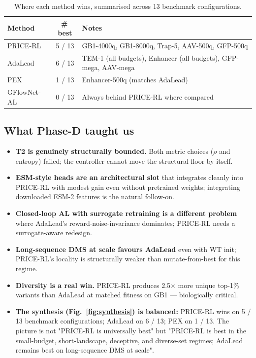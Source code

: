 \begin{table}[t]
\centering
\caption{Where each method wins, summarised across 13 benchmark configurations.}
\label{tab:wins}
\small
\begin{tabular}{lcp{}}
\toprule
Method & \#\,best & Notes \\
\midrule
PRICE-RL    & 5 / 13 & GB1-4000q, GB1-8000q, Trap-5, AAV-500q, GFP-500q \\
AdaLead     & 6 / 13 & TEM-1 (all budgets), Enhancer (all budgets), GFP-mega, AAV-mega \\
PEX         & 1 / 13 & Enhancer-500q (matches AdaLead) \\
GFlowNet-AL & 0 / 13 & Always behind PRICE-RL where compared \\
\bottomrule
\end{tabular}
\end{table}

\subsection{What Phase-D taught us}

\begin{itemize}\itemsep0pt
  \item \textbf{T2 is genuinely structurally bounded.} Both metric choices (\(\rho\) and entropy) failed; the controller cannot move the structural floor by itself.
  \item \textbf{ESM-style heads are an architectural slot} that integrates cleanly into PRICE-RL with modest gain even without pretrained weights; integrating downloaded ESM-2 features is the natural follow-on.
  \item \textbf{Closed-loop AL with surrogate retraining is a different problem} where AdaLead's reward-noise-invariance dominates; PRICE-RL needs a surrogate-aware redesign.
  \item \textbf{Long-sequence DMS at scale favours AdaLead} even with WT init; PRICE-RL's locality is structurally weaker than mutate-from-best for this regime.
  \item \textbf{Diversity is a real win.} PRICE-RL produces 2.5$\times$ more unique top-1\% variants than AdaLead at matched fitness on GB1 --- biologically critical.
  \item \textbf{The synthesis (Fig.~\ref{fig:synthesis}) is balanced:} PRICE-RL wins on 5 / 13 benchmark configurations; AdaLead on 6 / 13; PEX on 1 / 13. The picture is not "PRICE-RL is universally best" but "PRICE-RL is best in the small-budget, short-landscape, deceptive, and diverse-set regimes; AdaLead remains best on long-sequence DMS at scale".
\end{itemize}
